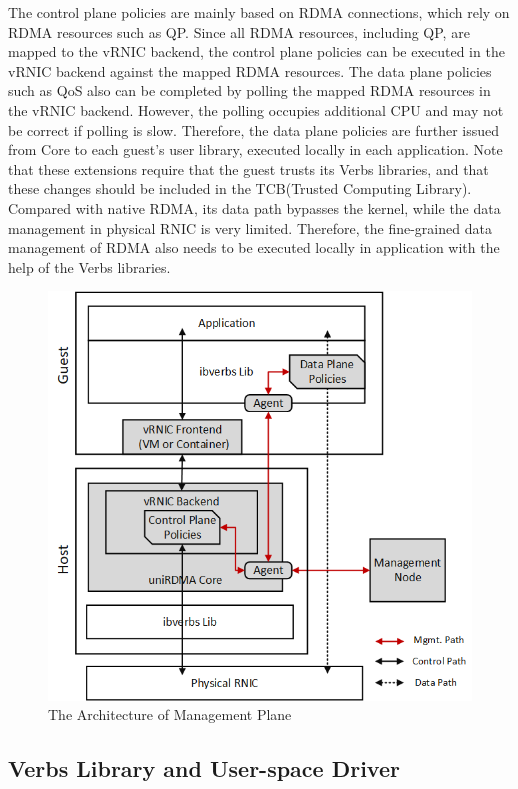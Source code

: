 The control plane policies are mainly based on RDMA connections, which rely on RDMA resources such as QP. Since all RDMA resources, including QP, are mapped to the vRNIC backend, the control plane policies can be executed in the vRNIC backend against the mapped RDMA resources. The data plane policies such as QoS also can be completed by polling the mapped RDMA resources in the vRNIC backend. However, the polling occupies additional CPU and may not be correct if polling is slow. Therefore, the data plane policies are further issued from \sys Core to each guest's user library, executed locally in each application. Note that these extensions require that the guest trusts its Verbs libraries, and that these changes should be included in the TCB(Trusted Computing Library). Compared with native RDMA, its data path bypasses the kernel, while the data management in physical RNIC is very limited. Therefore, the fine-grained data management of RDMA also needs to be executed locally in application with the help of the Verbs libraries.

\begin{figure}[!ht]
	\centering
	\includegraphics[width=1\linewidth]{images/mgmt-center.png}
	\caption{The Architecture of \sys Management Plane}
	\label{fig:mgmt-center}
\end{figure}

\subsection{Verbs Library and User-space Driver}

